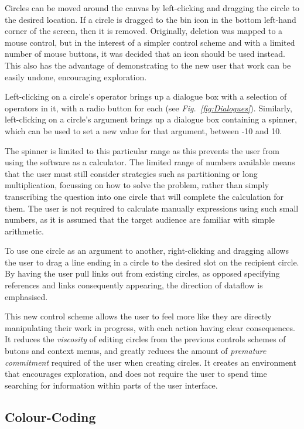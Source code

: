 \documentclass[12pt,twoside,notitlepage,xetex]{report}
\begin{document}
{Circles can be moved around the canvas by left-clicking and dragging the circle to the desired location.  If a circle is dragged to the bin icon in the bottom left-hand corner of the screen, then it is removed.  Originally, deletion was mapped to a mouse control, but in the interest of a simpler control scheme and with a limited number of mouse buttons, it was decided that an icon should be used instead.  This also has the advantage of demonstrating to the new user that work can be easily undone, encouraging exploration.

Left-clicking on a circle's operator brings up a dialogue box with a selection of operators in it, with a radio button for each (see \emph{Fig.~\ref{fig:Dialogues}}).  Similarly, left-clicking on a circle's argument brings up a dialogue box containing a spinner, which can be used to set a new value for that argument, between -10 and 10.

The spinner is limited to this particular range as this prevents the user from using the software as a calculator.  The limited range of numbers available means that the user must still consider strategies such as partitioning or long multiplication, focussing on how to solve the problem, rather than simply transcribing the question into one circle that will complete the calculation for them.  The user is not required to calculate manually expressions using such small numbers, as it is assumed that the target audience are familiar with simple arithmetic.

To use one circle as an argument to another, right-clicking and dragging allows the user to drag a line ending in a circle to the desired slot on the recipient circle.  By having the user pull links out from existing circles, as opposed specifying references and links consequently appearing, the direction of dataflow is emphasised.

This new control scheme allows the user to feel more like they are directly manipulating their work in progress, with each action having clear consequences.  It reduces the \emph{viscosity} of editing circles from the previous controls schemes of butons and context menus, and greatly reduces the amount of \emph{premature commitment} required of the user when creating circles.  It creates an environment that encourages exploration, and does not require the user to spend time searching for information within parts of the user interface.

\subsection{Colour-Coding}

}
\end{document}
